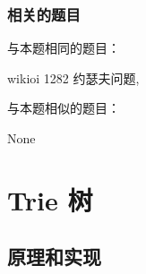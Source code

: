 \subsubsection{相关的题目}
与本题相同的题目：
\begindot
\item wikioi 1282 约瑟夫问题, 
\myenddot

与本题相似的题目：
\begindot
\item None
\myenddot


\section{Trie 树} %


\subsection{原理和实现}

